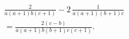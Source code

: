 \begin{multline*}
 \frac{2}{a(a+1)b(c+1)} - 2\,\frac{1}{a(a+1)(b+1)c} \\
 = 
 \frac{2(c-b)}{a(a+1)b(b+1)c(c+1)}.
\end{multline*}
